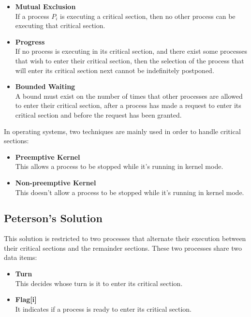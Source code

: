 \documentclass{article}
\begin{document}
\begin{itemize}
	\item \textbf{Mutual Exclusion}
	\vspace{.2cm} \\
	If a process $P_i$ is executing a critical section, then no other process can be executing that critical section.
	
	\item \textbf{Progress}
	\vspace{.2cm} \\
	If no process is executing in its critical section, and there exist some processes that wish to enter their critical section, then the selection of the process that will enter its critical section next cannot be indefinitely postponed.
	
	\item \textbf{Bounded Waiting}
	\vspace{.2cm} \\
	A bound must exist on the number of times that other processes are allowed to enter their critical section, after a process has made a request to enter its critical section and before the request has been granted.
\end{itemize}
In operating systems, two techniques are mainly used in order to handle critical sections:

\begin{itemize}
	\item \textbf{Preemptive Kernel}
	\vspace{.2cm} \\
	This allows a process to be stopped while it's running in kernel mode.
	
	\item \textbf{Non-preemptive Kernel}
	\vspace{.2cm} \\
	This doesn't allow a process to be stopped while it's running in kernel mode.
\end{itemize}

\subsection{Peterson's Solution}
This solution is restricted to two processes that alternate their execution between their critical sections and the remainder sections. These two processes share two data items:

\begin{itemize}
	\item \textbf{Turn}
	\vspace{.2cm} \\
	This decides whose turn is it to enter its critical section.
	
	\item \textbf{Flag[i]}
	\vspace{.2cm} \\
	It indicates if a process is ready to enter its critical section.
\end{itemize}
\end{document}
